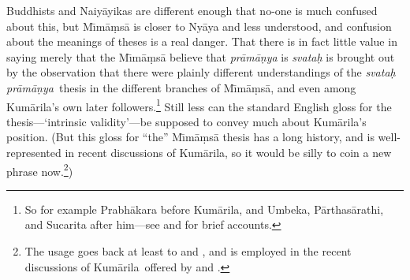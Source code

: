 \documentclass[11pt,letterpaper,oneside]{amsart}
\newcommand{\e}{\emph}
\newcommand{\kum}{Kum\={a}rila}
\newcommand{\svapra}{\e{svata\d{h} pr\={a}m\={a}\d{n}ya}}
\begin{document}
Buddhists and Naiy\=ayikas are different enough that no-one is much confused about this, but M\={\i}m\=a\d ms\=a is closer to Ny\=aya and less understood, and confusion about the meanings of theses is a real danger. That there is in fact little value in saying merely that the M\={\i}m\=a\d ms\=a believe that \emph{pr\=am\=a\d nya} is \emph{svata\d h} is brought out by the observation that there were plainly different understandings of the \svapra\ thesis in the different branches of M\={\i}m\=a\d ms\=a, and even among Kum\=arila's own later followers.\footnote{So for example Prabh\=akara before Kum\=arila, and Umbeka, P\=arthas\=arathi, and Sucarita after him---see \citet{chatterjea2003svatah} and \citet{taber1992dkb} for brief accounts.} Still less can the standard English gloss for the thesis---`intrinsic validity'---be supposed to convey much about \kum's position. (But this gloss for ``the'' M\={\i}m\=a\d ms\=a thesis has a long history, and is well-represented in recent discussions of \kum, so it would be silly to coin a new phrase now.\footnote{The usage goes back at least to \citet{keith1921karma} and \citet{radhakrishnan1927indian}, and is employed in the recent discussions of \kum\ offered by \citet{taber1992dkb} and \citet{arnold2001ivr}.})

\end{document}
